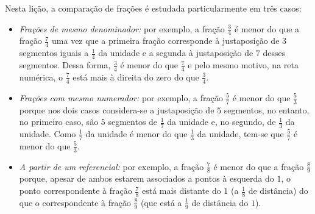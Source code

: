 \begin{center}
\hspace{3em}
\end{center}

Nesta lição, a comparação de frações é estudada particularmente em três casos:
\begin{itemize}
\item \textit{Frações de mesmo denominador:} por exemplo, a fração $\frac{3}{4}$ é menor do que a fração $\frac{7}{4}$ uma vez que a primeira fração corresponde à justaposição de $3$ segmentos iguais a $\frac{1}{4}$ da unidade e a segunda à justaposição de $7$ desses segmentos. Dessa forma, $\frac{3}{4}$ é menor do que $\frac{7}{4}$ e pelo mesmo motivo, na reta numérica, o $\frac{7}{4}$ está mais à direita do zero do que $\frac{3}{4}$.
\item \textit{Frações com mesmo numerador:}  por exemplo, a fração $\frac{5}{7}$ é menor do que $\frac{5}{3}$ porque nos dois casos considera-se a justaposição de $5$ segmentos, no entanto, no primeiro caso, são $5$ segmentos de $\frac{1}{7}$ da unidade e, no segundo, de $\frac{1}{3}$ da unidade. Como $\frac{1}{7}$ da unidade é menor do que $\frac{1}{3}$ da unidade, tem-se que $\frac{5}{7}$ é menor do que $\frac{5}{3}$.
\item \textit{A partir de um referencial:} por exemplo, a fração $\frac{7}{8}$ é menor do que a fração $\frac{8}{9}$ porque, apesar de ambos estarem associados a pontos à esquerda do $1$, o ponto correspondente à fração $\frac{7}{8}$ está mais distante do $1$ (a $\frac{1}{8}$ de distância) do que o correspondente à fração $\frac{8}{9}$ (que está a $\frac{1}{9}$ de distância do $1$).
\end{itemize}


